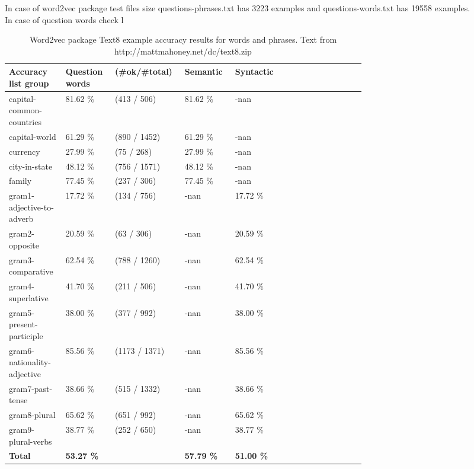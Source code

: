 \documentclass[letterpaper]{article}
\begin{document}
      In case of word2vec package test files size questions-phrases.txt has 3223 examples and questions-words.txt has 19558 examples.\\
      In case of question words check l



	\begin{table}[ht]
	\centering
	\begin{tabular}{|p{0.1\linewidth}|p{0.1\linewidth}|p{0.1\linewidth}|p{0.1\linewidth}|p{0.1\linewidth}|p{0.1\linewidth}|p{0.1\linewidth}|}
		\hline
		\textbf{Accuracy list group}& \textbf{Question words}  & \textbf{(\#ok/\#total)}& \textbf{Semantic} & \textbf{Syntactic}\\
		\hline
		\hline
		capital-common-countries& 81.62 \% & (413 / 506) & 81.62 \% & -nan\\
		\hline
		capital-world& 61.29 \% & (890 / 1452) & 61.29 \% & -nan\\
		\hline
		currency& 27.99 \% & (75 / 268) & 27.99 \% & -nan\\
		\hline
		city-in-state& 48.12 \% & (756 / 1571)& 48.12 \% & -nan\\
		\hline
		family&77.45 \% & (237 / 306)& 77.45 \% &  -nan \\
		\hline
		gram1-adjective-to-adverb& 17.72 \% &  (134 / 756)& -nan & 17.72 \% \\
		\hline
	    gram2-opposite& 20.59 \% & (63 / 306)& -nan & 20.59 \% \\
		\hline
		gram3-comparative&62.54 \% & (788 / 1260)& -nan & 62.54 \% \\
		\hline
		gram4-superlative&41.70 \% &  (211 / 506)& -nan & 41.70 \% \\
		\hline
		gram5-present-participle& 38.00 \% & (377 / 992)& -nan &  38.00 \% \\
		\hline
		gram6-nationality-adjective&85.56 \% &  (1173 / 1371)& -nan & 85.56 \% \\
		\hline
		gram7-past-tense& 38.66 \% & (515 / 1332) & -nan & 38.66 \% \\
		\hline
		gram8-plural& 65.62 \% & (651 / 992) & -nan & 65.62 \% \\
		\hline
		gram9-plural-verbs&38.77 \% & (252 / 650)& -nan & 38.77 \% \\
		\hline
		\hline
		\textbf{Total}& \textbf{53.27 \% }&  & \textbf{57.79 \% }&  \textbf{51.00 \% }\\
		\hline
		
	\end{tabular}
	\caption{Word2vec package Text8 example accuracy results for words and phrases. Text from  http://mattmahoney.net/dc/text8.zip}
	\label{tab:original-accuracy-results}
\end{table}	
\end{document}
